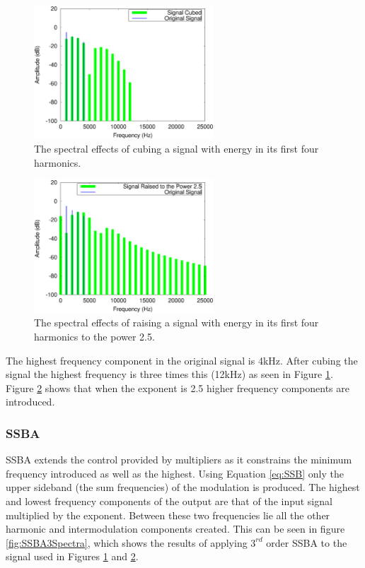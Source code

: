 			\begin{figure}[h!]
				\centering
				\includegraphics[width=0.6\textwidth]{chapter5/Images/CubedSpectra.eps}
				\caption{The spectral effects of cubing a signal with energy in its first four harmonics.}
				\label{fig:CubedSpectra}
			\end{figure}

			\begin{figure}[h!]
				\centering
				\includegraphics[width=0.6\textwidth]{chapter5/Images/RaisedToTwoAndAHalfSpectra.eps}
				\caption{The spectral effects of raising a signal with energy in its first four harmonics
					 to the power 2.5.}
				\label{fig:TwoAndAHalfSpectra}
			\end{figure}

			The highest frequency component in the original signal is 4kHz. After cubing the signal the highest
			frequency is three times this (12kHz) as seen in Figure \ref{fig:CubedSpectra}. Figure
			\ref{fig:TwoAndAHalfSpectra} shows that when the exponent is 2.5 higher frequency components are
			introduced. 

		\subsubsection*{SSBA}
			SSBA extends the control provided by multipliers as it constrains the minimum frequency introduced
			as well as the highest. Using Equation \ref{eq:SSB} only the upper sideband (the sum frequencies)
			of the modulation is produced. The highest and lowest frequency components of the output are that
			of the input signal multiplied by the exponent. Between these two frequencies lie all the other
			harmonic and intermodulation components created. This can be seen in figure \ref{fig:SSBA3Spectra},
			which shows the results of applying $3^{rd}$ order SSBA to the signal used in Figures
			\ref{fig:CubedSpectra} and \ref{fig:TwoAndAHalfSpectra}. 			
			
